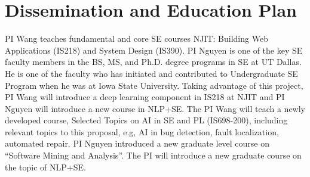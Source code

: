 \section{Dissemination and Education Plan}
\label{edu}



PI Wang teaches fundamental and core SE courses NJIT: Building Web Applications (IS218) and System Design (IS390).
PI Nguyen is one of the key SE faculty members in the BS, MS, and Ph.D.
degree programs in SE at UT Dallas. 
%
He is one of the faculty who has initiated and contributed to
Undergraduate SE Program when he was at Iowa State University.
Taking advantage of this project, PI Wang will introduce a deep learning component in IS218 at NJIT 
and PI Nguyen will introduce a new
course in NLP+SE. 
The PI Wang will teach a newly developed course, 
Selected Topics on AI in SE and PL (IS698-200), 
including relevant topics to this proposal, e.g, 
AI in bug detection, fault localization, automated repair. 
PI Nguyen introduced a new graduate level course on ``Software Mining and
Analysis''. The PI will introduce a new graduate course on the topic
of NLP+SE. 



